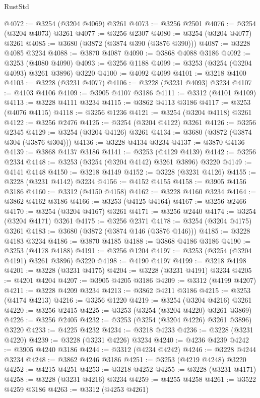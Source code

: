 \begin{lexlean}{RustStd}
\begin{coremodule}
@4072 := @3254 (@3204 @4069) @3261
@4073 := @3256 @2501
@4076 := @3254 (@3204 @4073) @3261
@4077 := @3256 @2307
@4080 := @3254 (@3204 @4077) @3261
@4085 := @3680 (@3872 (@3874 @390 (@3876 @390)))
@4087 := @3228 @4085 @3234
@4088 := @3870 @4087
@4090 := @3868 @4088 @3186
@4092 := @3253 (@4080 @4090)
@4093 := @3256 @1188
@4099 := @3253 (@3254 (@3204 @4093) @3261 @3896) @3220
@4100 := @4092 @4099
@4101 := @3218 @4100
@4103 := @3228 (@3231 @4077)
@4106 := @3228 (@3231 @4093) @3234
@4107 := @4103 @4106
@4109 := @3905 @4107 @3186
@4111 := @3312 (@4101 @4109)
@4113 := @3228 @4111 @3234
@4115 := @3862 @4113 @3186
@4117 := @3253 (@4076 @4115)
@4118 := @3256 @1236
@4121 := @3254 (@3204 @4118) @3261
@4122 := @3256 @2476
@4125 := @3254 (@3204 @4122) @3261
@4126 := @3256 @2345
@4129 := @3254 (@3204 @4126) @3261
@4134 := @3680 (@3872 (@3874 @304 (@3876 @304)))
@4136 := @3228 @4134 @3234
@4137 := @3870 @4136
@4139 := @3868 @4137 @3186
@4141 := @3253 (@4129 @4139)
@4142 := @3256 @2334
@4148 := @3253 (@3254 (@3204 @4142) @3261 @3896) @3220
@4149 := @4141 @4148
@4150 := @3218 @4149
@4152 := @3228 (@3231 @4126)
@4155 := @3228 (@3231 @4142) @3234
@4156 := @4152 @4155
@4158 := @3905 @4156 @3186
@4160 := @3312 (@4150 @4158)
@4162 := @3228 @4160 @3234
@4164 := @3862 @4162 @3186
@4166 := @3253 (@4125 @4164)
@4167 := @3256 @2466
@4170 := @3254 (@3204 @4167) @3261
@4171 := @3256 @2440
@4174 := @3254 (@3204 @4171) @3261
@4175 := @3256 @2371
@4178 := @3254 (@3204 @4175) @3261
@4183 := @3680 (@3872 (@3874 @146 (@3876 @146)))
@4185 := @3228 @4183 @3234
@4186 := @3870 @4185
@4188 := @3868 @4186 @3186
@4190 := @3253 (@4178 @4188)
@4191 := @3256 @1204
@4197 := @3253 (@3254 (@3204 @4191) @3261 @3896) @3220
@4198 := @4190 @4197
@4199 := @3218 @4198
@4201 := @3228 (@3231 @4175)
@4204 := @3228 (@3231 @4191) @3234
@4205 := @4201 @4204
@4207 := @3905 @4205 @3186
@4209 := @3312 (@4199 @4207)
@4211 := @3228 @4209 @3234
@4213 := @3862 @4211 @3186
@4215 := @3253 (@4174 @4213)
@4216 := @3256 @1220
@4219 := @3254 (@3204 @4216) @3261
@4220 := @3256 @2415
@4225 := @3253 (@3254 (@3204 @4220) @3261 @3869)
@4226 := @3256 @2405
@4232 := @3253 (@3254 (@3204 @4226) @3261 @3896) @3220
@4233 := @4225 @4232
@4234 := @3218 @4233
@4236 := @3228 (@3231 @4220)
@4239 := @3228 (@3231 @4226) @3234
@4240 := @4236 @4239
@4242 := @3905 @4240 @3186
@4244 := @3312 (@4234 @4242)
@4246 := @3228 @4244 @3234
@4248 := @3862 @4246 @3186
@4251 := @3253 (@4219 @4248) @3220
@4252 := @4215 @4251
@4253 := @3218 @4252
@4255 := @3228 (@3231 @4171)
@4258 := @3228 (@3231 @4216) @3234
@4259 := @4255 @4258
@4261 := @3522 @4259 @3186
@4263 := @3312 (@4253 @4261)

\end{coremodule}
\end{lexlean}

